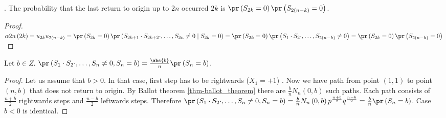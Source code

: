 \begin{thm}\label{thm-return_origin_upto_time}
 \Lrws. The probability that the last return to origin up to \Time $2n$ occurred \intime $2k$
  is $\pr \left( S_{2k}=0 \right) \pr \left( S_{2 \left( n-k \right) }=0 \right) $.
\end{thm}
\begin{proof}
 $\alpha{2n} \left( 2k \right) =u_{2k}u_{2 \left( n-k \right) }
 =\pr \left( S_{2k}=0 \right) \pr \left( S_{2k+1}\cdot S_{2k+2}\cdot, \ldots, S_{2n}\neq 0 \mid S_{2k}=0 \right)
 =\pr \left( S_{2k}=0 \right) \pr \left( S_{1}\cdot S_{2}\cdot, \ldots, S_{2 \left( n-k \right) }\neq 0 \right)
 =\pr \left( S_{2k}=0 \right) \pr \left( S_{2 \left( n-k \right) }=0 \right) $
\end{proof}
\begin{thm}\label{thm-XXXX}
 Let $b \in Z$. $\pr \left( S_1\cdot S_2 \cdot, \ldots, S_n\neq 0, S_n=b \right)
 =\frac{\abs{b}}{n}\pr \left( S_n=b \right) $.
\end{thm}
\begin{proof}
 Let us \Wlog assume that $b>0$. In that case, first step has to be rightwards ($X_1=+1$) . Now we have path from point $ \left( 1,1 \right) $ to point $ \left( n,b \right) $ that does not return to origin.
 By Ballot theorem \ref{thm-ballot_theorem} there are $\frac{b}{n}N_n \left( 0,b \right) $ such paths. Each path consists of $\frac{n+b}{2}$ rightwards steps and $\frac{n-b}{2}$ leftwards steps.
 Therefore $\pr \left( S_1\cdot S_2 \cdot, \ldots, S_n\neq 0, S_n=b \right)
 =\frac{b}{n}N_n \left( 0,b \right) p^{\frac{n+b}{2}}q^{\frac{n-b}{2}}
 =\frac{b}{n}\pr \left( S_n=b \right) $. Case $b<0$ is identical.
\end{proof}

